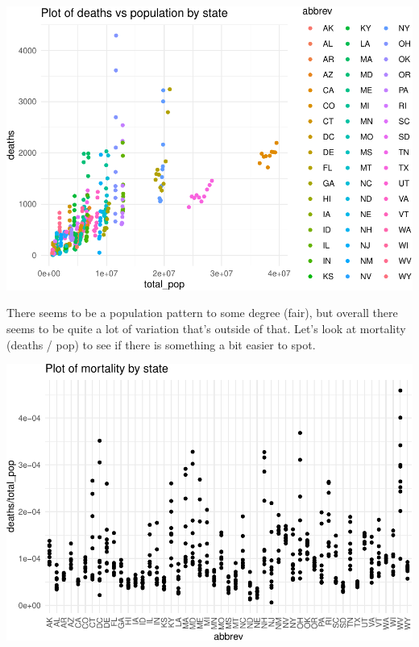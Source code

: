 \documentclass[]{article}
\newenvironment{Shaded}{\begin{snugshade}}{\end{snugshade}}
\newcommand{\DataTypeTok}[1]{\textcolor[rgb]{0.13,0.29,0.53}{#1}}
\newcommand{\DecValTok}[1]{\textcolor[rgb]{0.00,0.00,0.81}{#1}}
\newcommand{\FloatTok}[1]{\textcolor[rgb]{0.00,0.00,0.81}{#1}}
\newcommand{\KeywordTok}[1]{\textcolor[rgb]{0.13,0.29,0.53}{\textbf{#1}}}
\newcommand{\NormalTok}[1]{#1}
\newcommand{\OperatorTok}[1]{\textcolor[rgb]{0.81,0.36,0.00}{\textbf{#1}}}
\newcommand{\StringTok}[1]{\textcolor[rgb]{0.31,0.60,0.02}{#1}}
\begin{document}
\includegraphics{Assignment_1_files/figure-latex/plots3-1.pdf}

There seems to be a population pattern to some degree (fair), but
overall there seems to be quite a lot of variation that's outside of
that. Let's look at mortality (deaths / pop) to see if there is
something a bit easier to spot.

\begin{Shaded}
\end{Shaded}

\includegraphics{Assignment_1_files/figure-latex/plots4-1.pdf}
\end{document}
